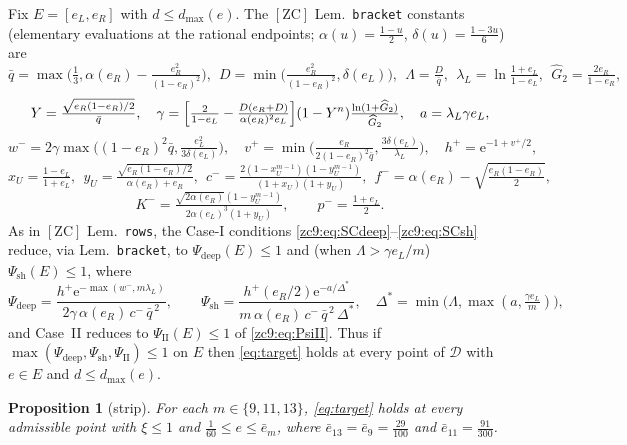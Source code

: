 \documentclass[11pt]{amsart}
\newtheorem{proposition}[theorem]{Proposition}
\newcommand{\eu}{\mathrm{e}}
\newcommand{\D}{\mathcal D}
\newcommand{\ZC}{[\textrm{ZC}]}
\begin{document}
Fix $E=[e_L,e_R]$ with $d\le d_{\max}(e)$.  The $\ZC$ Lem.~\texttt{bracket}
constants (elementary evaluations at the rational endpoints;
$\alpha(u)=\tfrac{1-u}2$, $\delta(u)=\tfrac{1-3u}6$) are
\[
 \bar q=\max\bigl(\tfrac13,\alpha(e_R)-\tfrac{e_R^2}{(1-e_R)^2}\bigr),\ \
 D=\min\bigl(\tfrac{e_R^2}{(1-e_R)^2},\delta(e_L)\bigr),\ \
 \Lambda=\tfrac D{\bar q},\ \
 \lambda_L=\ln\tfrac{1+e_L}{1-e_L},\ \
 \widehat G_2=\tfrac{2e_R}{1-e_R},
\]
\[
 Y=\tfrac{\sqrt{e_R(1-e_R)/2}}{\bar q},\quad
 \gamma=\Bigl[\tfrac2{1-e_L}-\tfrac{D(e_R+D)}{\alpha(e_R)^2e_L}\Bigr]
 (1-Y^n)\tfrac{\ln(1+\widehat G_2)}{\widehat G_2},\quad a=\lambda_L\gamma e_L,
\]
\[
 w^-=2\gamma\max\bigl((1-e_R)^2\bar q,\tfrac{e_L^2}{3\delta(e_L)}\bigr),\quad
 v^+=\min\bigl(\tfrac{e_R}{2(1-e_R)^2\bar q},\tfrac{3\delta(e_L)}{\lambda_L}\bigr),\quad
 h^+=\eu^{-1+v^+/2},
\]
\[
 x_U=\tfrac{1-e_L}{1+e_L},\ \
 y_U=\tfrac{\sqrt{e_R(1-e_R)/2}}{\alpha(e_R)+e_R},\ \
 c^-=\tfrac{2(1-x_U^{m-1})(1-y_U^{m-1})}{(1+x_U)(1+y_U)},\ \
 f^-=\alpha(e_R)-\sqrt{\tfrac{e_R(1-e_R)}2},
\]
\[
 K^-=\tfrac{\sqrt{2\alpha(e_R)}(1-y_U^{m-1})}{2\alpha(e_L)^3(1+y_U)},\qquad
 p^-=\tfrac{1+e_L}2 .
\]
As in $\ZC$ Lem.~\texttt{rows}, the Case-I conditions
\eqref{zc9:eq:SCdeep}--\eqref{zc9:eq:SCsh} reduce, via Lem.~\texttt{bracket}, to
$\Psi_{\mathrm{deep}}(E)\le1$ and (when $\Lambda>\gamma e_L/m$)
$\Psi_{\mathrm{sh}}(E)\le1$, where
\[
 \Psi_{\mathrm{deep}}=\frac{h^+\eu^{-\max(w^-,m\lambda_L)}}
 {2\gamma\,\alpha(e_R)\,c^-\,\bar q^{\,2}},\qquad
 \Psi_{\mathrm{sh}}=\frac{h^+(e_R/2)\eu^{-a/\Delta^*}}
 {m\,\alpha(e_R)\,c^-\,\bar q^{\,2}\,\Delta^*},\quad
 \Delta^*=\min\bigl(\Lambda,\max(a,\tfrac{\gamma e_L}m)\bigr),
\]
and Case~II reduces to $\Psi_{\mathrm{II}}(E)\le1$ of \eqref{zc9:eq:PsiII}.
Thus if $\max(\Psi_{\mathrm{deep}},\Psi_{\mathrm{sh}},\Psi_{\mathrm{II}})\le1$ on
$E$ then \eqref{eq:target} holds at every point of $\D$ with $e\in E$ and
$d\le d_{\max}(e)$.

\begin{proposition}[strip]\label{zc9:prop:strip}
For each $m\in\{9,11,13\}$, \eqref{eq:target} holds at every admissible point
with $\xi\le1$ and $\tfrac1{60}\le e\le\bar e_m$, where
$\bar e_{13}=\bar e_9=\tfrac{29}{100}$ and $\bar e_{11}=\tfrac{91}{300}$.
\end{proposition}
\end{document}
